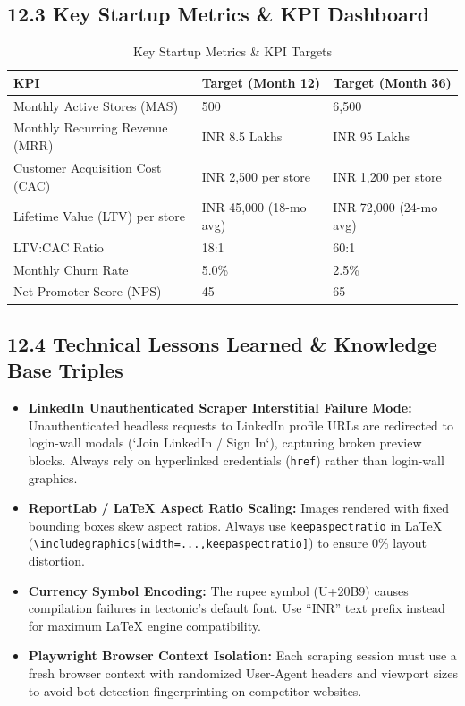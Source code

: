 \documentclass[11pt,a4paper]{article}
\begin{document}
\subsection{12.3 Key Startup Metrics \& KPI Dashboard}

\begin{table}[h!]
\centering
\small
\begin{tabularx}{\textwidth}{XXX}
\toprule
\textbf{KPI} & \textbf{Target (Month 12)} & \textbf{Target (Month 36)} \\
\midrule
Monthly Active Stores (MAS) & 500 & 6,500 \\
Monthly Recurring Revenue (MRR) & INR 8.5 Lakhs & INR 95 Lakhs \\
Customer Acquisition Cost (CAC) & INR 2,500 per store & INR 1,200 per store \\
Lifetime Value (LTV) per store & INR 45,000 (18-mo avg) & INR 72,000 (24-mo avg) \\
LTV:CAC Ratio & 18:1 & 60:1 \\
Monthly Churn Rate & 5.0\% & 2.5\% \\
Net Promoter Score (NPS) & 45 & 65 \\
\bottomrule
\end{tabularx}
\caption{Key Startup Metrics \& KPI Targets}
\end{table}

\subsection{12.4 Technical Lessons Learned \& Knowledge Base Triples}

\begin{tcolorbox}[colback=bluebg,colframe=navyblue,title=\textbf{Documented Technical Lessons Learned:}]
    \begin{itemize}[leftmargin=*]
        \item \textbf{LinkedIn Unauthenticated Scraper Interstitial Failure Mode:} Unauthenticated headless requests to LinkedIn profile URLs are redirected to login-wall modals (`Join LinkedIn / Sign In`), capturing broken preview blocks. Always rely on hyperlinked credentials (\texttt{href}) rather than login-wall graphics.
        \item \textbf{ReportLab / LaTeX Aspect Ratio Scaling:} Images rendered with fixed bounding boxes skew aspect ratios. Always use \texttt{keepaspectratio} in LaTeX (\texttt{\textbackslash includegraphics[width=...,keepaspectratio]}) to ensure 0\% layout distortion.
        \item \textbf{Currency Symbol Encoding:} The rupee symbol (U+20B9) causes compilation failures in tectonic's default font. Use ``INR'' text prefix instead for maximum LaTeX engine compatibility.
        \item \textbf{Playwright Browser Context Isolation:} Each scraping session must use a fresh browser context with randomized User-Agent headers and viewport sizes to avoid bot detection fingerprinting on competitor websites.
    \end{itemize}
\end{tcolorbox}
\end{document}
